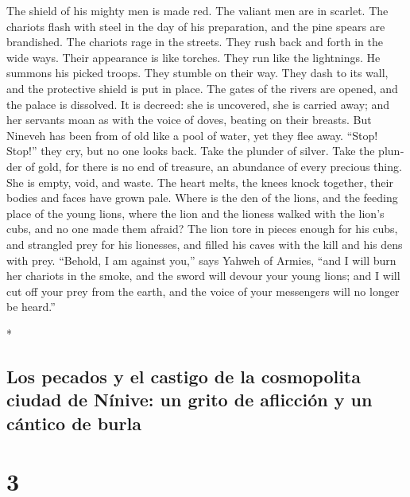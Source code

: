 \begin{paracol}{2}
\begin{otherlanguage}{english}
 The shield of his mighty men is made red. The valiant men
are in scarlet. The chariots flash with steel in the day of his
preparation, and the pine spears are brandished.  The
chariots rage in the streets. They rush back and forth in the wide ways.
Their appearance is like torches. They run like the lightnings.
 He summons his picked troops. They stumble on their way.
They dash to its wall, and the protective shield is put in place.
 The gates of the rivers are opened, and the palace is
dissolved.  It is decreed: she is uncovered, she is
carried away; and her servants moan as with the voice of doves, beating
on their breasts.  But Nineveh has been from of old like a
pool of water, yet they flee away. ``Stop! Stop!'' they cry, but no one
looks back.  Take the plunder of silver. Take the plunder
of gold, for there is no end of treasure, an abundance of every precious
thing.  She is empty, void, and waste. The heart melts,
the knees knock together, their bodies and faces have grown pale.
 Where is the den of the lions, and the feeding place of
the young lions, where the lion and the lioness walked with the lion's
cubs, and no one made them afraid?  The lion tore in
pieces enough for his cubs, and strangled prey for his lionesses, and
filled his caves with the kill and his dens with prey. 
``Behold, I am against you,'' says Yahweh of Armies, ``and I will burn
her chariots in the smoke, and the sword will devour your young lions;
and I will cut off your prey from the earth, and the voice of your
messengers will no longer be heard.''

\end{otherlanguage}

\switchcolumn[0]*

\hypertarget{los-pecados-y-el-castigo-de-la-cosmopolita-ciudad-de-nuxednive-un-grito-de-aflicciuxf3n-y-un-cuxe1ntico-de-burla}{%
\subsection{Los pecados y el castigo de la cosmopolita ciudad de Nínive:
un grito de aflicción y un cántico de
burla}\label{los-pecados-y-el-castigo-de-la-cosmopolita-ciudad-de-nuxednive-un-grito-de-aflicciuxf3n-y-un-cuxe1ntico-de-burla}}

\hypertarget{section-4}{%
\section{3}\label{section-4}}


\end{paracol}
